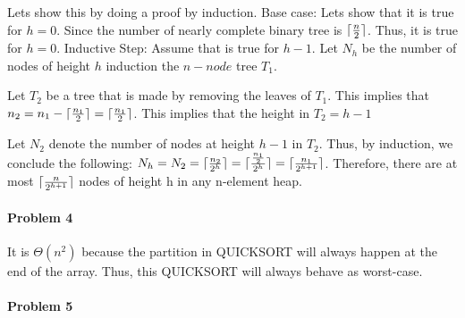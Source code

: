 \documentclass[11pt]{article}
\begin{document}
\begin{flushleft}
    Lets show this by doing a proof by induction.
    \newline
    \newline
    Base case:
    \newline
    Lets show that it is true for $h=0$. Since the number of nearly complete binary tree is 
    ${\lceil{\frac{n}{2}}\rceil}$. Thus, it is true for $h=0$.
    \newline
    \newline
    Inductive Step:
    \newline
    Assume that is true for $h-1$. Let $N_h$ be the number of nodes of height $h$ induction
    the $n-node$ tree $T_1$. 
    
    Let $T_2$ be a tree that is made by removing the leaves of $T_1$. This implies that $n_2 = n_1 - {\lceil{\frac{n_1}{2}}\rceil} = {\lceil{\frac{n_1}{2}}\rceil}$.
    This implies that the height in $T_2 = h - 1$

    Let $N_2$ denote the number of nodes at height $h-1$ in $T_2$. Thus, by induction, we conclude the following:
    \newline
    \newline
    $N_h = N_2 = {\lceil{\frac{n_2}{2^h}}\rceil} = {\lceil{\frac{\frac{n_1}{2}}{2^h}}\rceil} = {\lceil{\frac{n_1}{2^{h+1}}}\rceil}$.
    \newline
    \newline
    Therefore, there are at most ${\lceil{\frac{n}{2^{h+1}}}\rceil}$ nodes of height h in any n-element heap.
\end{flushleft}  


\paragraph{\noindent\textbf{\LARGE{Problem 4}}}

\begin{flushleft}
    It is $\Theta(n^2)$ because the partition in QUICKSORT will always happen at the end of the array. 
    Thus, this QUICKSORT will always behave as worst-case.
\end{flushleft}

\paragraph{\noindent\textbf{\LARGE{Problem 5}}}
\end{document}
